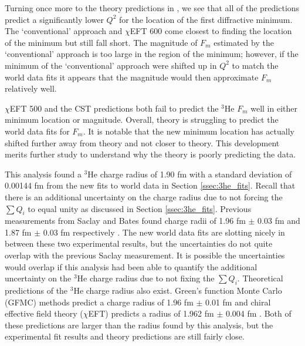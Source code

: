 Turning once more to the theory predictions in \cite{Article:Marcucci}, we see that all of the predictions predict a significantly lower $Q^2$ for the location of the first diffractive minimum. The `conventional' approach and $\chi$EFT 600 come closest to finding the location of the minimum but still fall short. The magnitude of $F_m$ estimated by the `conventional' approach is too large in the region of the minimum; however, if the minimum of the `conventional' approach were shifted up in $Q^2$ to match the world data fits it appears that the magnitude would then approximate $F_m$ relatively well. 

$\chi$EFT 500 and the CST predictions both fail to predict the $^3$He $F_m$ well in either minimum location or magnitude. Overall, theory is struggling to predict the world data fits for $F_m$. It is notable that the new minimum location has actually shifted further away from theory and not closer to theory. This development merits further study to understand why the theory is poorly predicting the data. 

This analysis found a $^3$He charge radius of 1.90 fm with a standard deviation of 0.00144 fm from the new fits to world data in Section \ref{ssec:3he_fits}. Recall that there is an additional uncertainty on the charge radius due to not forcing the $\sum Q_i$ to equal unity as discussed in Section \ref{ssec:3he_fits}. Previous measurements from Saclay and Bates found charge radii of 1.96 fm $\pm$ 0.03 fm and 1.87 fm $\pm$ 0.03 fm respectively \cite{3h_proposal}. The new world data fits are slotting nicely in between these two experimental results, but the uncertainties do not quite overlap with the previous Saclay measurement. It is possible the uncertainties would overlap if this analysis had been able to quantify the additional uncertainty on the $^3$He charge radius due to not fixing the $\sum Q_i$. Theoretical predictions of the $^3$He charge radius also exist. Green's function Monte Carlo (GFMC) methods predict a charge radius of 1.96 fm $\pm$ 0.01 fm and chiral effective field theory ($\chi$EFT) predicts a radius of 1.962 fm $\pm$ 0.004 fm \cite{3h_proposal}. Both of these predictions are larger than the radius found by this analysis, but the experimental fit results and theory predictions are still fairly close.

